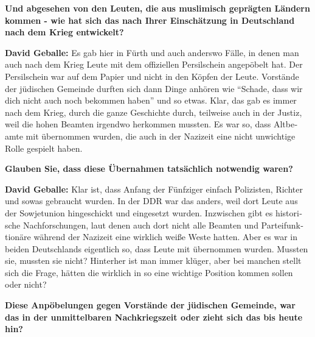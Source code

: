 \begin{otherlanguage}{ngerman}
\textbf{Und abgesehen von den Leuten, die aus muslimisch geprägten Ländern kommen - wie hat sich das nach Ihrer Einschätzung in Deutschland nach dem Krieg entwickelt?} 

\textbf{David Geballe:} Es gab hier in Fürth und auch anderswo Fälle, in denen man auch nach dem Krieg Leute mit dem offiziellen Persilschein angepöbelt hat. Der Persilschein war auf dem Papier und nicht in den Köpfen der Leute. Vorstände der jüdischen Gemeinde durften sich dann Dinge anhören wie "`Schade, dass wir dich nicht auch noch bekommen haben"' und so etwas. Klar, das gab es immer nach dem Krieg, durch die ganze Geschichte durch, teilweise auch in der Justiz, weil die hohen Beamten irgendwo herkommen mussten. Es war so, dass Altbeamte mit übernommen wurden, die auch in der Nazizeit eine nicht unwichtige Rolle gespielt haben. 

\textbf{Glauben Sie, dass diese Übernahmen tatsächlich notwendig waren?} 

\textbf{David Geballe:} Klar ist, dass Anfang der Fünfziger einfach Polizisten, Richter und sowas gebraucht wurden. In der DDR war das anders, weil dort Leute aus der Sowjetunion hingeschickt und eingesetzt wurden. Inzwischen gibt es historische Nachforschungen, laut denen auch dort nicht alle Beamten und Parteifunktionäre während der Nazizeit eine wirklich weiße Weste hatten. Aber es war in beiden Deutschlands eigentlich so, dass Leute mit übernommen wurden. Mussten sie, mussten sie nicht? Hinterher ist man immer klüger, aber bei manchen stellt sich die Frage, hätten die wirklich in so eine wichtige Position kommen sollen oder nicht? 

\textbf{Diese Anpöbelungen gegen Vorstände der jüdischen Gemeinde, war das in der unmittelbaren Nachkriegszeit oder zieht sich das bis heute hin?} 


\end{otherlanguage}

